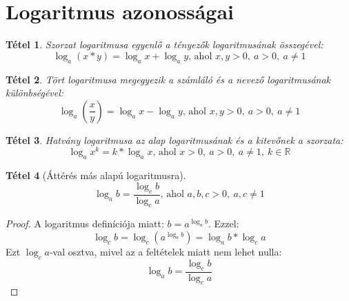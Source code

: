 \documentclass[twoside,12pt]{report}
\newtheorem{theorem}{Tétel}[section]
\theoremstyle{definition}
\begin{document}
\section{Logaritmus azonosságai}
	\begin{theorem}
		Szorzat logaritmusa egyenlő a tényezők logaritmusának összegével:
		\begin{equation*}
			\log_a(x*y)=\log_ax+\log_ay\text{, ahol }x,y>0,\ a>0,\ a\ne1
		\end{equation*}
	\end{theorem}
	\begin{theorem}
		Tört logaritmusa megegyezik a számláló és a nevező logaritmusának különbségével:
		\begin{equation*}
			\log_a\left(\frac{x}{y}\right)=\log_ax-\log_ay\text{, ahol }x,y>0,\ a>0,\ a\ne1
		\end{equation*}
	\end{theorem}
	\begin{theorem}
		Hatvány logaritmusa az alap logaritmusának és a kitevőnek a szorzata:
		\begin{equation*}
			\log_a x^k=k*\log_ax\text{, ahol }x>0,\ a>0,\ a\ne1,\ k\in\mathbb{R}
		\end{equation*}
	\end{theorem}
	\begin{theorem}[Áttérés más alapú logaritmusra]
		\begin{equation*}
			\log_ab=\frac{\log_cb}{\log_ca}\text{, ahol }a,b,c>0,\ a,c\ne1
		\end{equation*}
	\end{theorem}
	\begin{proof}
		A logaritmus definíciója miatt: $b=a^{\log_ab}$. Ezzel:
		\begin{equation*}
			\log_cb=\log_c\left(a^{\log_ab}\right)=\log_ab*\log_ca
		\end{equation*}
		Ezt $\log_ca$-val osztva, mivel az a feltételek miatt nem lehet nulla:
		\begin{equation*}
			\log_ab=\frac{\log_cb}{\log_ca}
		\end{equation*}
	\end{proof}
\end{document}
